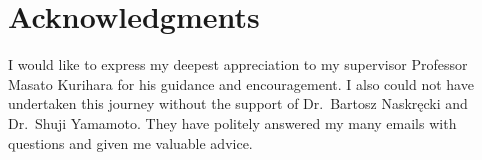 \documentclass[main]{subfiles}
\begin{document}
{}
\section*{Acknowledgments}
I would like to express my deepest appreciation to my supervisor Professor Masato Kurihara for his guidance and encouragement.
I also could not have undertaken this journey without the support of Dr.~Bartosz Naskręcki and Dr.~Shuji Yamamoto.
They have politely answered my many emails with questions and given me valuable advice.
\end{document}
